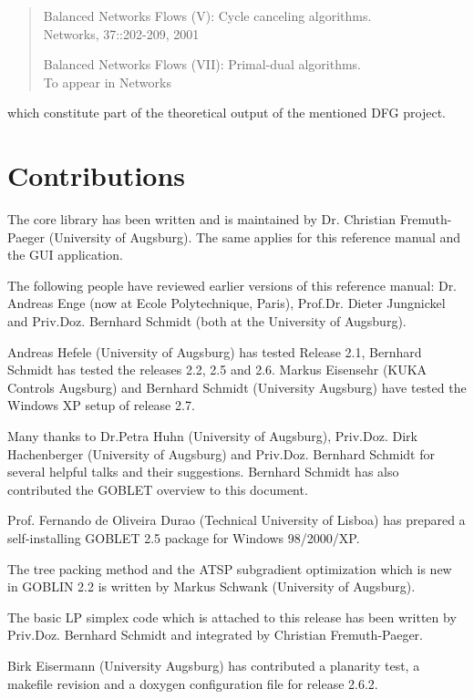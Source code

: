 \documentclass[a4paper,11pt,twoside]{book}
\begin{document}
\begin{multicols}{2}
\begin{quote}
Balanced Networks Flows (V): Cycle canceling algorithms. \\
    Networks, 37::202-209, 2001

Balanced Networks Flows (VII): Primal-dual algorithms. \\
    To appear in Networks

\end{quote}
which constitute part of the theoretical output of the mentioned DFG project.


\section{Contributions}
\label{slb_contrib}

The core library has been written and is maintained by Dr. Christian
Fremuth-Paeger (University of Augsburg). The same applies for this reference
manual and the GUI application.

The following people have reviewed earlier versions of this reference manual:
Dr. Andreas Enge (now at Ecole Polytechnique, Paris), Prof.Dr. Dieter
Jungnickel and Priv.Doz. Bernhard Schmidt (both at the University of Augsburg).

Andreas Hefele (University of Augsburg) has tested Release 2.1, Bernhard
Schmidt has tested the releases 2.2, 2.5 and 2.6. Markus Eisensehr (KUKA
Controls Augsburg) and Bernhard Schmidt (University Augsburg) have tested
the Windows XP setup of release 2.7.

Many thanks to Dr.Petra Huhn (University of Augsburg), Priv.Doz. Dirk
Hachenberger (University of Augsburg) and Priv.Doz. Bernhard Schmidt for
several helpful talks and their suggestions. Bernhard Schmidt has also
contributed the GOBLET overview to this document.

Prof. Fernando de Oliveira Durao (Technical University of Lisboa)
has prepared a self-installing GOBLET 2.5 package for Windows 98/2000/XP.

The tree packing method and the ATSP subgradient optimization which is new
in GOBLIN 2.2 is written by Markus Schwank (University of Augsburg).

The basic LP simplex code which is attached to this release has been
written by Priv.Doz. Bernhard Schmidt and integrated by Christian
Fremuth-Paeger.

Birk Eisermann (University Augsburg) has contributed a planarity test, a
makefile revision and a doxygen configuration file for release 2.6.2.


\end{multicols}
\end{document}
